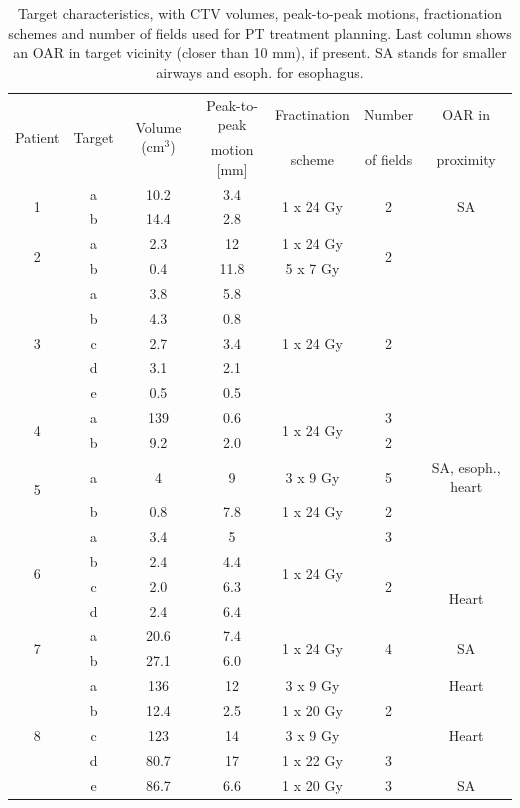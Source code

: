 \documentclass[type=dr, dr=rernat, accentcolor=tud7b,colorbacktitle, bigchapter, openright, twoside, 12pt ]{tudthesis}
\begin{document}
\begin{table}[H]
	\centering
	\caption{Target characteristics, with CTV volumes, peak-to-peak motions, fractionation schemes and number of fields used for PT treatment planning. Last column 
	shows an OAR in target vicinity (closer than 10 mm), if present. SA stands for smaller airways and esoph. for esophagus.}
	\begin{tabular}{c|c|c|c|c|c|c}
		\hline\hline
		\multirow{2}{*}{Patient} & \multirow{2}{*}{Target} & \multirow{2}{*}{Volume (cm$^3$)} & Peak-to-peak & Fractination & Number & OAR in \\
		 & & & motion [mm] & scheme & of fields & proximity \\
		\hline
		\multirow{2}{*}{1} & a & 10.2 & 3.4  & \multirow{2}{*}{1 x 24 Gy} & \multirow{2}{*}{2} & \multirow{2}{*}{SA} \\
		 & b & 14.4 & 2.8 &  &  &  \\

		 \hline
		 \multirow{2}{*}{2} & a & 2.3 & 12  & 1 x 24 Gy & \multirow{2}{*}{2} \\
		 & b & 0.4 & 11.8  & 5 x 7 Gy &  \\
		 \hline
		 \multirow{5}{*}{3} & a & 3.8 & 5.8  & \multirow{5}{*}{1 x 24 Gy} & \multirow{5}{*}{2} \\
		  & b & 4.3 & 0.8  &  & \\
		  & c & 2.7 & 3.4  &  & \\
		  & d & 3.1 & 2.1  &  & \\
		  & e & 0.5 & 0.5  &  & \\
		  \hline
		  \multirow{2}{*}{4} & a & 139 & 0.6 & \multirow{2}{*}{1 x 24 Gy} & 3 \\
		 & b & 9.2 & 2.0  &  & 2 \\
		 \hline
		 \multirow{2}{*}{5} & a & 4 & 9  & 3 x 9 Gy  & 5 & SA, esoph., heart \\
		 & b & 0.8 & 7.8  & 1 x 24 Gy & 2 \\
		 \hline
		 \multirow{4}{*}{6} & a & 3.4   & 5    & \multirow{4}{*}{1 x 24 Gy} & 3  \\
				    & b & 2.4 & 4.4  & & \multirow{3}{*}{2} \\
				    & c & 2.0 & 6.3  & & & \multirow{2}{*}{Heart}\\
				    & d & 2.4 & 6.4  & & \\
		\hline	    
		\multirow{2}{*}{7} & a & 20.6 & 7.4 & \multirow{2}{*}{1 x 24 Gy} & \multirow{2}{*}{4} & \multirow{2}{*}{SA}  \\
		 & b & 27.1 & 6.0  &  &   \\
		 \hline
		 \multirow{5}{*}{8} & a & 136 & 12  & 3 x 9 Gy & \multirow{3}{*}{2} & Heart\\
		  & b & 12.4 & 2.5  & 1 x 20 Gy &  &\\
		  & c & 123 & 14  & 3 x 9 Gy &  &Heart \\
		 & d & 80.7 & 17  & 1 x 22 Gy & 3  &\\
		 & e & 86.7 & 6.6  & 1 x 20 Gy & 3 & SA \\
		\hline\hline
	\end{tabular}
	\label{tab:patdata2}
\end{table}
\end{document}
